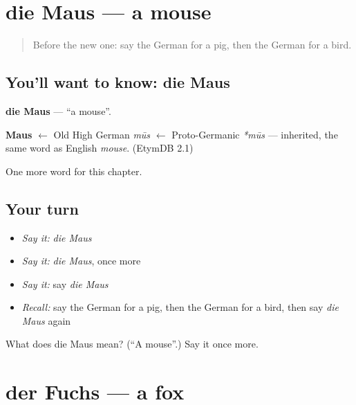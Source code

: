 \section[die Maus]{die Maus — a mouse}

\label{lesson:GE-C86-maus}



\begin{quote}
Before the new one: say the German for a pig, then the German for a bird.
\end{quote}

\subsection*{You'll want to know: die Maus}
\textbf{die Maus} — \textquotedblleft{}a mouse\textquotedblright{}.

\begin{cousinweb}
\textbf{Maus} $\leftarrow$ Old High German \emph{mūs} $\leftarrow$ Proto-Germanic \emph{*mūs} — inherited, the same word as English \emph{mouse}. (EtymDB 2.1)
\end{cousinweb}

\begin{grammarlens}[title={What you've built}]
One more word for this chapter.
\end{grammarlens}

\subsection*{Your turn}
\begin{itemize}
\raggedright
  \item \emph{Say it:} \emph{die Maus}
  \item \emph{Say it:} \emph{die Maus}, once more
  \item \emph{Say it:} say \emph{die Maus}
  \item \emph{Recall:} say the German for a pig, then the German for a bird, then say \emph{die Maus} again
\end{itemize}

\begin{tcolorbox}[breakable,colback=teal!4,colframe=teal!35!black,title={Before you move on}]
What does die Maus mean? (\textquotedblleft{}A mouse\textquotedblright{}.) Say it once more.
\end{tcolorbox}
\section[der Fuchs]{der Fuchs — a fox}

